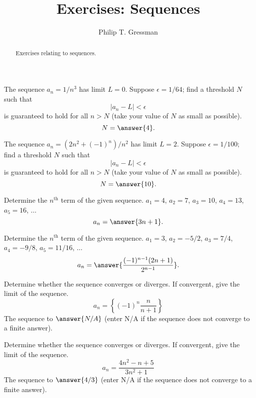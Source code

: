 \documentclass{ximera}
\title{Exercises: Sequences}
\author{Philip T. Gressman}
\begin{document}
\begin{abstract}
Exercises relating to sequences.
\end{abstract}
\maketitle

\begin{exercise}
The sequence $a_n = 1/n^3$ has limit $L = 0$. Suppose $\epsilon = 1/64$; find a threshold $N$ such that
\[ |a_n -L| < \epsilon \]
is guaranteed to hold for all $n > N$ (take your value of $N$ as small as possible).
\[ N = \answer{4}. \]
\end{exercise}

\begin{exercise}
The sequence $a_n = (2n^2 + (-1)^n)/n^2$ has limit $L = 2$. Suppose $\epsilon = 1/100$; find a threshold $N$ such that
\[ |a_n -L| < \epsilon \]
is guaranteed to hold for all $n > N$ (take your value of $N$ as small as possible).
\[ N = \answer{10}. \]
\end{exercise}

\begin{exercise}%
Determine the \(n^\text{th}\) term of the given sequence. $a_1 = 4$, $a_2 = 7$, $a_3 = 10$, $a_4 = 13$, $a_5 = 16$, \(\ldots\)
\[ a_n = \answer{3n+1}. \]
\end{exercise}
\begin{exercise}%
Determine the \(n^\text{th}\) term of the given sequence. $a_1 = 3$, $a_2 = -5/2$, $a_3 = 7/4$, $a_4 = -9/8$, $a_5 = 11/16$, \(\ldots\)
\[ a_n = \answer{\frac{(-1)^{n-1} (2n+1)}{2^{n-1}}}. \]
\end{exercise}

\begin{exercise}%
Determine whether the sequence converges or diverges. If convergent, give the limit of the sequence. 
\[ a_n = \left\{(-1)^n\frac{n}{n+1}\right\} \]
The sequence  to $\answer{N/A}$ (enter N/A if the sequence does not converge to a finite answer).
\end{exercise}

\begin{exercise}%
Determine whether the sequence converges or diverges. If convergent, give the limit of the sequence. 
\[ a_n = \frac{4n^2-n+5}{3n^2+1} \]
The sequence  to $\answer{4/3}$ (enter N/A if the sequence does not converge to a finite answer).
\end{exercise}
\end{document}
